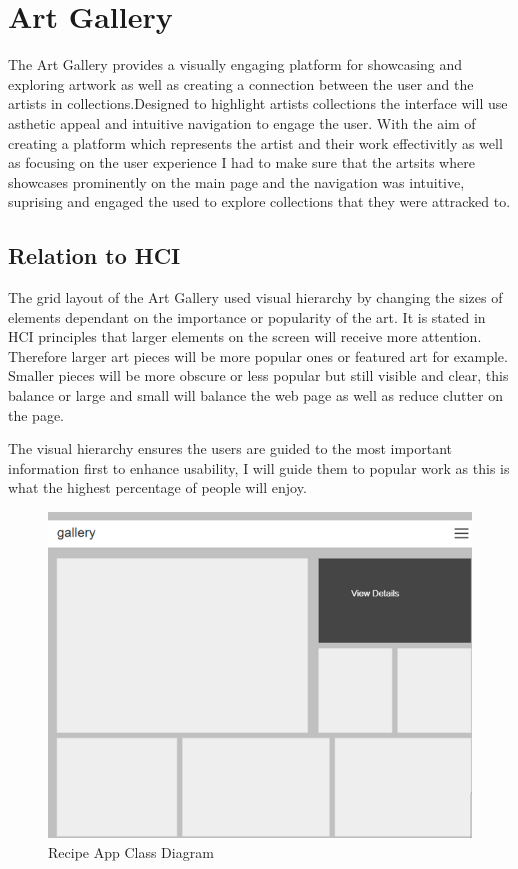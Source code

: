 \documentclass[]{project_interim}
\begin{document}
\section{Art Gallery}

The Art Gallery provides a visually engaging platform for showcasing and exploring artwork as well as creating a connection between the user and the artists in collections.Designed to highlight artists collections the interface will use asthetic appeal and intuitive navigation to engage the user.
With the aim of creating a platform which represents the artist and their work effectivitly as well as focusing on the user experience I had to make sure that the artsits where showcases prominently on the main page and the navigation was intuitive, suprising and engaged the used to explore collections that they were attracked to.

\subsection{Relation to HCI}

The grid layout of the Art Gallery used visual hierarchy by changing the sizes of elements dependant on the importance or popularity of the art. It is stated in HCI principles that larger elements on the screen will receive more attention. Therefore larger art pieces will be more popular ones or featured art for example. Smaller pieces will be more obscure or less popular but still visible and clear, this balance or large and small will balance the web page as well as reduce clutter on the page.

The visual hierarchy ensures the users are guided to the most important information first to enhance usability, I will guide them to popular work as this is what the highest percentage of people will enjoy.

\begin{figure}[ht!]
  \centering
  \includegraphics[width=\textwidth]{AG-homepage.png}
  \vspace*{0.0cm}
  \caption{Recipe App Class Diagram}
  \label{fig:1}
\end{figure}
\end{document}
